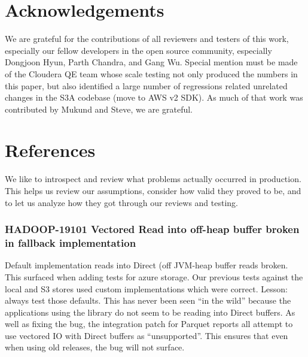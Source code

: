 \documentclass[conference]{IEEEtran}
\begin{document}
\section*{Acknowledgements}
\label{sec:acknowledgements}

We are grateful for the contributions of all reviewers and testers of this work,
especially our fellow developers in the open source community,
especially Dongjoon Hyun, Parth Chandra, and Gang Wu.
Special mention must be made of the Cloudera QE team whose scale testing
not only produced the numbers in this paper, but also identified a large number
of regressions related unrelated changes in the S3A codebase (move to AWS v2 SDK).
As much of that work was contributed by Mukund and Steve, we are grateful.



\section{References}
\label{sec:references}



We like to introspect and review what problems actually occurred
in production.
This helps us review our assumptions, consider how valid they proved
to be, and to let us analyze how they got through our reviews and testing.


\subsubsection{HADOOP-19101 Vectored Read into off-heap buffer broken in fallback implementation}
\label{s:HADOOP-19101}

Default implementation reads into Direct (off JVM-heap buffer reads broken.
This surfaced when adding tests for azure storage.
Our previous tests against the local and S3 stores used custom implementations
which were correct. Lesson: always test those defaults.
This has never been seen ``in the wild'' because the applications
using the library do not seem to be reading into Direct buffers.
As well as fixing the bug, the integration patch for Parquet reports all
attempt to use vectored IO with Direct buffers as ``unsupported''.
This ensures that even when using old releases, the bug will not surface.




\end{document}
